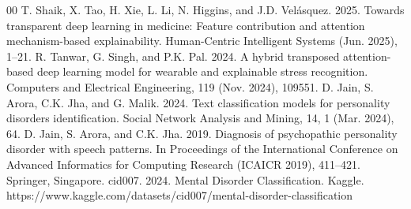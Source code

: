 \documentclass{article}
\begin{document}
\begin{thebibliography}{00}
 T. Shaik, X. Tao, H. Xie, L. Li, N. Higgins, and J.D. Velásquez. 2025. Towards transparent deep learning in medicine: Feature contribution and attention mechanism-based explainability. Human-Centric Intelligent Systems (Jun. 2025), 1--21.
 R. Tanwar, G. Singh, and P.K. Pal. 2024. A hybrid transposed attention-based deep learning model for wearable and explainable stress recognition. Computers and Electrical Engineering, 119 (Nov. 2024), 109551.
 D. Jain, S. Arora, C.K. Jha, and G. Malik. 2024. Text classification models for personality disorders identification. Social Network Analysis and Mining, 14, 1 (Mar. 2024), 64.
 D. Jain, S. Arora, and C.K. Jha. 2019. Diagnosis of psychopathic personality disorder with speech patterns. In Proceedings of the International Conference on Advanced Informatics for Computing Research (ICAICR 2019), 411--421. Springer, Singapore.
 cid007. 2024. Mental Disorder Classification. Kaggle. https://www.kaggle.com/datasets/cid007/mental-disorder-classification
\end{thebibliography}
\end{document}
